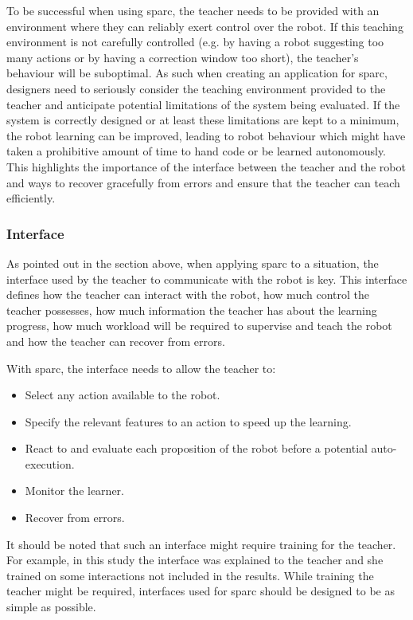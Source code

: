 To be successful when using \gls{sparc}, the teacher needs to be provided with an environment where they can reliably exert control over the robot. If this teaching environment is not carefully controlled (e.g. by having a robot suggesting too many actions or by having a correction window too short), the teacher's behaviour will be suboptimal. As such when creating an application for \gls{sparc}, designers need to seriously consider the teaching environment provided to the teacher and anticipate potential limitations of the system being evaluated. If the system is correctly designed or at least these limitations are kept to a minimum, the robot learning can be improved, leading to robot behaviour which might have taken a prohibitive amount of time to hand code or be learned autonomously. This highlights the importance of the interface between the teacher and the robot and ways to recover gracefully from errors and ensure that the teacher can teach efficiently. 

\subsubsection{Interface} \label{sec:tuto_interface}

As pointed out in the section above, when applying \gls{sparc} to a situation, the interface used by the teacher to communicate with the robot is key. This interface defines how the teacher can interact with the robot, how much control the teacher possesses, how much information the teacher has about the learning progress, how much workload will be required to supervise and teach the robot and how the teacher can recover from errors.

With \gls{sparc}, the interface needs to allow the teacher to:
\begin{itemize}
	\item Select any action available to the robot.
	\item Specify the relevant features to an action to speed up the learning.
	\item React to and evaluate each proposition of the robot before a potential auto-execution.
	\item Monitor the learner.
	\item Recover from errors.
\end{itemize}

It should be noted that such an interface might require training for the teacher. For example, in this study the interface was explained to the teacher and she trained on some interactions not included in the results. While training the teacher might be required, interfaces used for \gls{sparc} should be designed to be as simple as possible.

